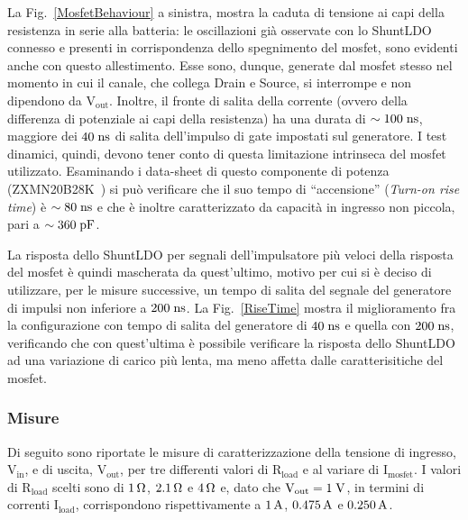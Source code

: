 La Fig.~\ref{MosfetBehaviour} a sinistra, mostra la caduta di tensione ai capi della resistenza in serie alla batteria: le oscillazioni già osservate con lo ShuntLDO connesso e presenti in corrispondenza dello spegnimento del mosfet, sono evidenti anche con questo allestimento.
Esse sono, dunque, generate dal mosfet stesso nel momento in cui il canale, che collega Drain e Source, si interrompe e non dipendono da $\mathrm{V_{out}}$.
Inoltre, il fronte di salita della corrente (ovvero della differenza di potenziale ai capi della resistenza) ha una durata di $\sim 100 \rm \; ns$, maggiore dei $40\rm \; ns$ di salita dell'impulso di gate impostati sul generatore. I test dinamici, quindi, devono tener conto di questa limitazione intrinseca del mosfet utilizzato. Esaminando i data-sheet di questo componente di potenza (ZXMN20B28K~\cite{MOSFET}) si può verificare che il suo tempo di ``accensione'' (\textit{Turn-on rise time}) è $\sim 80 \rm \; ns$ e che \`e inoltre caratterizzato da capacità in ingresso non piccola, pari a $\sim 360\rm \; pF$.

%
%

La risposta dello ShuntLDO per segnali dell'impulsatore più veloci della risposta del mosfet è quindi mascherata da quest'ultimo, motivo per cui si è deciso di utilizzare, per le misure successive, un tempo di salita del segnale del generatore di impulsi non inferiore a $200 \rm \; ns$.
La Fig.~\ref{RiseTime} mostra il miglioramento fra la configurazione con tempo di salita del generatore di $40 \rm \; ns$ e quella con $200 \rm \; ns$, verificando che con quest'ultima è possibile verificare la risposta dello ShuntLDO ad una variazione di carico più lenta, ma meno affetta dalle caratterisitiche del mosfet.

\subsubsection{Misure}

Di seguito sono riportate le misure di caratterizzazione della tensione di ingresso, $\mathrm{V_{in}}$, e di uscita, $\mathrm{V_{out}}$, per tre differenti valori di $\mathrm{R_{load}}$ e al variare di $\mathrm{I_{mosfet}}$.
I valori di $\mathrm{R_{load}}$ scelti sono di $1 {\rm \, \Omega}$, $2.1 {\rm \, \Omega}$ e $4 {\rm \, \Omega}$ e, dato che $\mathrm{V_{out}=1 \rm \; V}$, in termini di correnti $\mathrm{I_{load}}$, corrispondono rispettivamente a $1 \rm \, A$, $0.475 \rm \, A$ e $0.250 \rm \, A$.

